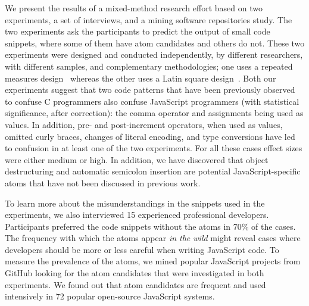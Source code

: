 We present the results of a mixed-method research effort based on two experiments, a set of interviews, and a mining software repositories study. The two experiments ask the participants to predict the output of small code snippets, where some of them have atom candidates and others do not. These two experiments were designed and conducted independently, by different researchers, with different samples, and complementary methodologies; one uses a repeated measures design~\cite{Keselman:2001:ARM} whereas the other uses a Latin square design~\cite{Hunter-Experimenters}.  
Both our experiments suggest that two code patterns that have been previously observed to confuse C programmers also confuse JavaScript programmers (with statistical significance, after correction): the comma operator and assignments being used as values. In addition, pre- and post-increment operators, when used as values, omitted curly braces, changes of literal encoding, and type conversions have led to confusion in at least one of the two experiments. For all these cases effect sizes were either medium or high. In addition, we have discovered that object destructuring and automatic semicolon insertion are potential JavaScript-specific atoms that have not been discussed in previous work.

To learn more about the misunderstandings in the snippets used in the experiments, we also interviewed 15 experienced professional developers. Participants preferred the code snippets without the atoms in 70\% of the cases. The frequency with which the atoms appear \emph{in the wild} might reveal cases where developers should be more or less careful when writing JavaScript code. To measure the prevalence of the atoms, we mined popular JavaScript projects from GitHub looking for the atom candidates that were investigated in both experiments. We found out 
that atom candidates are frequent and used intensively in 72 popular open-source JavaScript systems.


